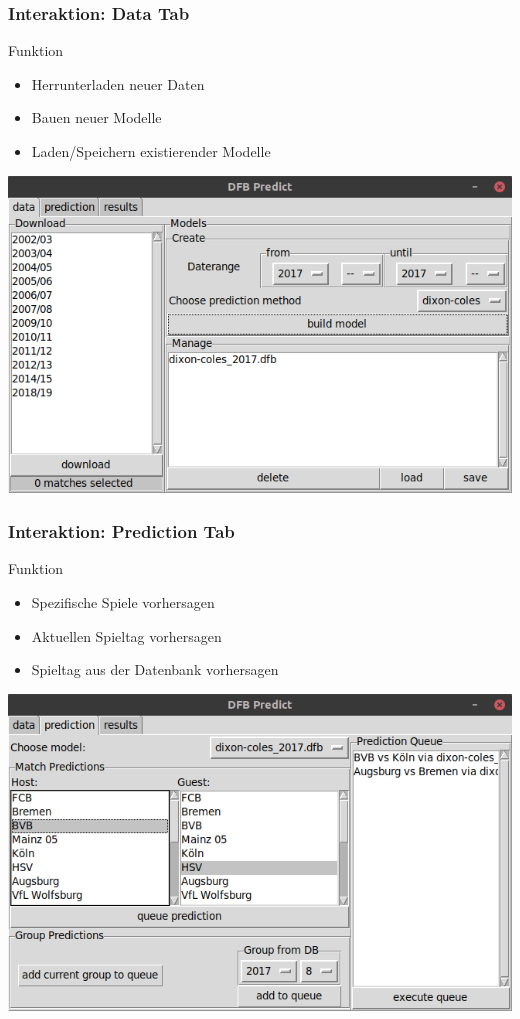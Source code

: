 \documentclass{beamer}
\begin{document}
    \begin{frame}
        \frametitle{Interaktion: Data Tab}
        \begin{block}{Funktion}
            \begin{itemize}
                \item Herrunterladen neuer Daten
                \item Bauen neuer Modelle
                \item Laden/Speichern existierender Modelle
            \end{itemize}
        \end{block}
        \center\includegraphics[scale=.3]{gui_imgs/001.png}
    \end{frame}
    \begin{frame}
        \frametitle{Interaktion: Prediction Tab}
        \begin{block}{Funktion}
            \begin{itemize}
                \item Spezifische Spiele vorhersagen
                \item Aktuellen Spieltag vorhersagen
                \item Spieltag aus der Datenbank vorhersagen
            \end{itemize}
        \end{block}
        \center\includegraphics[scale=.3]{gui_imgs/002.png}
    \end{frame}
\end{document}
